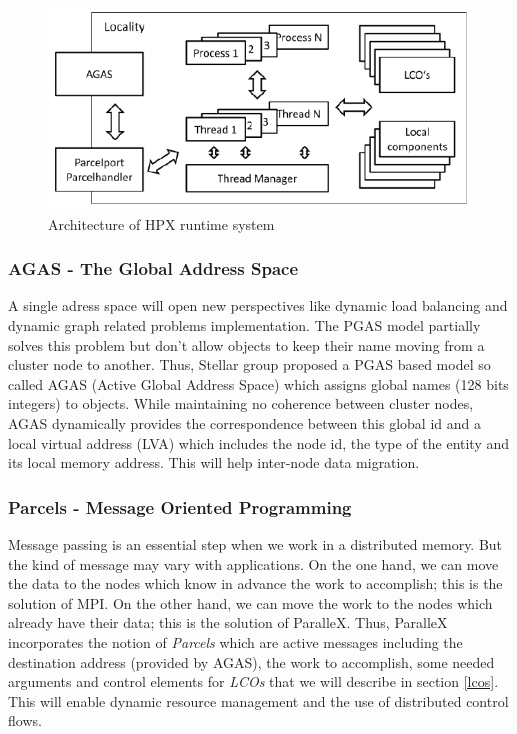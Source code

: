 \documentclass[smallextended]{svjour3}
\begin{document}
\begin{figure}[h]
\begin{center}
\includegraphics[scale=0.55]{Images/Im4.png}
\end{center}
\caption{Architecture of HPX runtime system}
\label{ArchiHPX}
\end{figure}

\subsubsection{AGAS - The Global Address Space}
A single adress space will open new perspectives like dynamic load balancing and dynamic graph related problems implementation. The PGAS model \cite{PGAS} partially solves this problem but don't allow objects to keep their name moving from a cluster node to another. Thus, Stellar group proposed a PGAS based model so called AGAS (Active Global Address Space) \cite{ParalleX} which assigns
global names (128 bits integers) to objects. While maintaining no coherence between cluster nodes, AGAS dynamically provides the correspondence between this global id and a local virtual address (LVA) \cite{ParalleX} which includes the node id, the type of the entity and its local memory address. This will help inter-node data migration.

\subsubsection{Parcels - Message Oriented Programming}
Message passing is an essential step when we work in a distributed memory. But the kind of message may vary with applications. On the one hand, we can move the data to the nodes which know in advance the work to accomplish; this is the solution of MPI. On the other hand, we can move the work to the nodes which already have their data; this is the solution of ParalleX. Thus, ParalleX incorporates the notion of \emph{Parcels} \cite{ParalleX} which are active messages including the destination address (provided by AGAS), the work to accomplish, some needed arguments and control elements for \emph{LCOs} that we will describe in section \ref{lcos}. This will enable dynamic resource
management and the use of distributed control flows.
\end{document}
